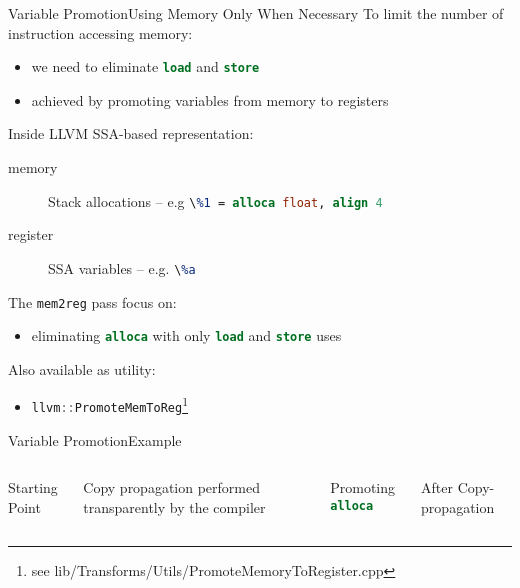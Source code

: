 \documentclass[10pt,mathserif]{beamer}
\newcommand{\cppinline}[1]{\lstinline[language=C++]!#1!}
\newcommand{\llvminput}[1]{}
\newcommand{\llvminline}[1]{\lstinline[language=LLVM]!#1!}
\begin{document}
\begin{frame}{Variable Promotion}{Using Memory Only When Necessary}
To limit the number of instruction accessing memory:

\begin{itemize}
\item we need to eliminate \llvminline{load} and \llvminline{store}
\item achieved by \alert{promoting} variables from memory to registers
\end{itemize}

Inside LLVM SSA-based representation:

\begin{description}
\item[memory] Stack allocations --
              e.g \llvminline{\%1 = alloca float, align 4}
\item[register] SSA variables -- e.g. \llvminline{\%a}
\end{description}

The \texttt{mem2reg} pass focus on:

\begin{itemize}
\item eliminating \llvminline{alloca} with only \llvminline{load} and
      \llvminline{store} uses
\end{itemize}

Also available as utility:

\begin{itemize}
\item \cppinline{llvm::PromoteMemToReg}\footnote{see lib/Transforms/Utils/PromoteMemoryToRegister.cpp}
\end{itemize}
\end{frame}

\begin{frame}{Variable Promotion}{Example}
\begin{columns}[t]
\begin{block}{Starting Point}
\centering
\llvminput{snippet/02/saxpy.ll}
\end{block}

Copy propagation performed transparently by the compiler

\begin{block}{Promoting \llvminline{alloca}}
\centering
\llvminput{snippet/02/mem2reg-saxpy.ll}
\end{block}

\begin{block}{After Copy-propagation}
\centering
\llvminput{snippet/02/mem2reg-copy-saxpy.ll}
\end{block}

\end{columns}
\end{frame}
\end{document}
